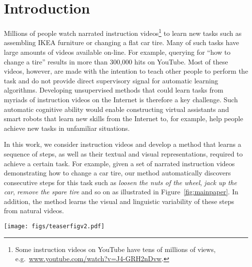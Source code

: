 \documentclass[10pt,twocolumn,letterpaper]{article}
\begin{document}
\section{Introduction}
Millions of people watch narrated instruction videos\footnote{Some instruction videos on YouTube have tens of millions of views, 
e.g.~\url{www.youtube.com/watch?v=J4-GRH2nDvw}.} to learn new tasks such as assembling IKEA furniture or changing a flat car tire. 
Many of such tasks have large amounts of videos available on-line. For example, querying for ``how to change a tire'' results in more than 300,000 hits on YouTube.
Most of these videos, however, are made with the intention to teach other people to perform the task and do not provide direct supervisory signal for automatic learning algorithms. Developing unsupervised methods that could learn tasks from myriads of instruction videos on the Internet is therefore a key challenge.
Such automatic cognitive ability would enable constructing virtual assistants and smart robots that learn new skills from the Internet to, for example, help people achieve new tasks in unfamiliar situations. 








In this work, we consider instruction videos and develop a method that learns a sequence of steps, as well as their textual and visual representations, required to achieve a certain task. 
For example, given a set of narrated instruction videos demonstrating how to change a car tire, our method automatically discovers consecutive steps for this task such as {\em loosen the nuts of the wheel}, {\em jack up the car}, {\em remove the spare tire} and so on as illustrated in Figure~\ref{fig:mainpaper}. 
In addition, the method learns the visual and linguistic variability of these steps from natural videos.


 \begin{figure*}[t]
       \centering
       \texttt{[image: figs/teaserfigv2.pdf]}
     \caption{\small Given a set of narrated instruction videos demonstrating a particular task, we wish to automatically discover the main steps to achieve the task and associate each step with its corresponding narration and appearance in each video. Here frames from two videos demonstrating changing the car tire are shown, together with excerpts of the corresponding narrations.  Note the large variations in both the narration and appearance of the different steps highlighted by the same colors in both videos (here only three steps are shown).}
     \vspace{-4mm}
\label{fig:mainpaper}
 \end{figure*}
\end{document}
